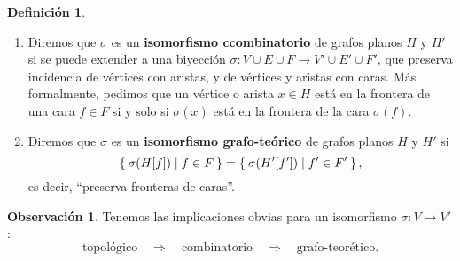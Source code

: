 \documentclass[12pt]{report}
\theoremstyle{plain}
\theoremstyle{definition}
\newtheorem{definition}[theorem]{Definición}
\newtheorem{obs}[theorem]{Observación}
\begin{document}

\begin{definition}
\begin{enumerate}[(2)]
\item Diremos que $\sigma$ es un \textbf{isomorfismo ccombinatorio} de grafos planos $H$ y $H'$ si se puede extender a una biyección $\sigma : V \cup E \cup F \rightarrow V' \cup E' \cup F'$, que preserva incidencia de vértices con aristas, y de vértices y aristas con caras. Más formalmente, pedimos que un vértice o arista $x \in H$ está en la frontera de una cara $ f \in F$ si y solo si $\sigma (x)$ está en la frontera de la cara $\sigma (f)$.
\item Diremos que $\sigma$ es un \textbf{isomorfismo grafo-teórico} de grafos planos $H$ y $H'$ si
\[
    \Set{ \sigma (H [f]) | f \in F} = \Set{ \sigma (H' [f']) | f' \in F'},
\]
es decir, ``preserva fronteras de caras''.
\end{enumerate}
\end{definition}

\begin{obs}
Tenemos las implicaciones obvias para un isomorfismo $\sigma : V \rightarrow V'$:
\[
    \text{topológico} \quad \Rightarrow \quad \text{combinatorio} \quad \Rightarrow \quad \text{grafo-teorético}.
\]
\end{obs}
\end{document}
